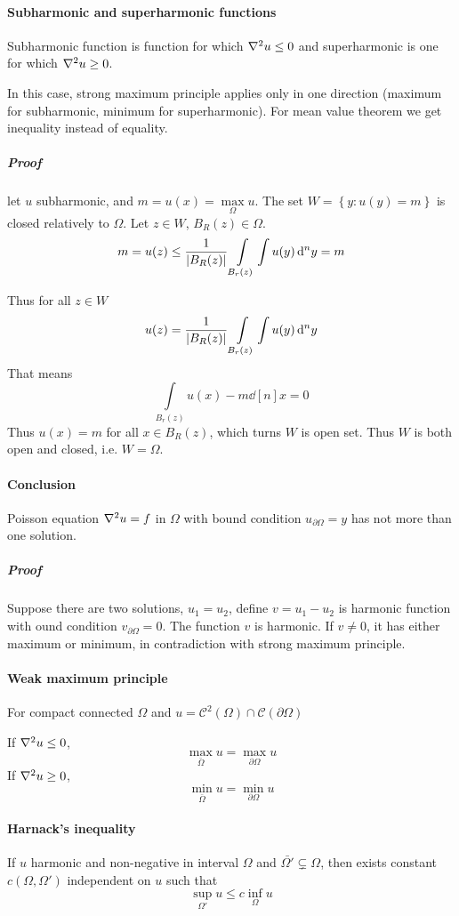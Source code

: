 	\paragraph{Subharmonic and superharmonic functions}
	Subharmonic function is function for which $\laplacian{u}\leq 0$ and superharmonic is one for which $\laplacian{u}\geq0$.
	
	In this case, strong maximum principle applies only in one direction (maximum for subharmonic, minimum for superharmonic). For mean value theorem we get inequality instead of equality.
	
	\subparagraph{Proof}
	let $u$ subharmonic, and $m = u(x) = \max\limits_{\Omega} u$.
	The set $W= \left\{ y: u(y)=m \right\} $ is closed relatively to $\Omega$.
	Let $z\in W$, $B_R(z) \in \Omega$.
	$$m = u(z) \leq \frac{1}{\abs{B_R(z)}} \int\limits_{B_r(z)} \int u(y) \dd[n]{y} = m$$
	
	Thus for all $z\in W$
	$$u(z) = \frac{1}{\abs{B_R(z)}} \int\limits_{B_r(z)} \int u(y) \dd[n]{y}$$
	That means
	$$\int\limits_{B_r(z)} u(x) - m \dd[n]{x}= 0$$
	Thus $u(x) = m$ for all $x\in B_R(z)$, which turns $W$ is open set. Thus $W$ is both open and closed, i.e. $W=\Omega$.
	
	\paragraph{Conclusion}
	Poisson equation $\laplacian{u} = f$ in $\Omega$ with bound condition $u_{\partial \Omega} = y$ has not more than one solution.
	\subparagraph{Proof}
	Suppose there are two solutions, $u_1=u_2$, define $v=u_1-u_2$ is harmonic function with ound condition  $v_{\partial \Omega} = 0$. The function $v$ is harmonic. If $v\neq 0$, it has either maximum or minimum, in contradiction with strong maximum principle.
	
	\paragraph{Weak maximum principle}
	For compact connected $\Omega$ and $u = \mathcal{C}^2(\Omega) \cap \mathcal{C}(\partial \Omega)$ 
	
	If $\laplacian{u} \leq 0$, 
	$$\max\limits_{\bar{\Omega}} u = \max\limits_{\partial \Omega} u$$
	If $\laplacian{u} \geq 0$, 
	$$\min\limits_{\bar{\Omega}} u = \min\limits_{\partial \Omega} u$$
	\paragraph{Harnack's inequality}
	If $u$ harmonic and non-negative in interval $\Omega$ and $\bar{\Omega'} \subsetneq \Omega$, then exists constant $c(\Omega, \Omega')$ independent on $u$ such that
	$$\sup\limits_{\Omega'} u \leq c \inf\limits_{\Omega} u$$
	